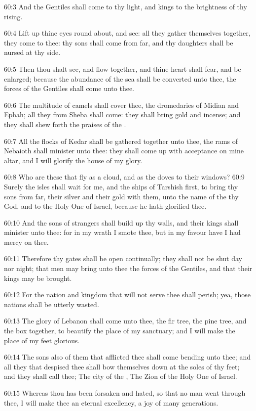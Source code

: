 60:3 And the Gentiles shall come to thy light, and kings to the
brightness of thy rising.

60:4 Lift up thine eyes round about, and see: all they gather
themselves together, they come to thee: thy sons shall come from far,
and thy daughters shall be nursed at thy side.

60:5 Then thou shalt see, and flow together, and thine heart shall
fear, and be enlarged; because the abundance of the sea shall be
converted unto thee, the forces of the Gentiles shall come unto thee.

60:6 The multitude of camels shall cover thee, the dromedaries of
Midian and Ephah; all they from Sheba shall come: they shall bring
gold and incense; and they shall shew forth the praises of the \LORD.

60:7 All the flocks of Kedar shall be gathered together unto thee, the
rams of Nebaioth shall minister unto thee: they shall come up with
acceptance on mine altar, and I will glorify the house of my glory.

60:8 Who are these that fly as a cloud, and as the doves to their
windows?  60:9 Surely the isles shall wait for me, and the ships of
Tarshish first, to bring thy sons from far, their silver and their
gold with them, unto the name of the \LORD thy God, and to the Holy One
of Israel, because he hath glorified thee.

60:10 And the sons of strangers shall build up thy walls, and their
kings shall minister unto thee: for in my wrath I smote thee, but in
my favour have I had mercy on thee.

60:11 Therefore thy gates shall be open continually; they shall not be
shut day nor night; that men may bring unto thee the forces of the
Gentiles, and that their kings may be brought.

60:12 For the nation and kingdom that will not serve thee shall
perish; yea, those nations shall be utterly wasted.

60:13 The glory of Lebanon shall come unto thee, the fir tree, the
pine tree, and the box together, to beautify the place of my
sanctuary; and I will make the place of my feet glorious.

60:14 The sons also of them that afflicted thee shall come bending
unto thee; and all they that despised thee shall bow themselves down
at the soles of thy feet; and they shall call thee; The city of the
\LORD, The Zion of the Holy One of Israel.

60:15 Whereas thou has been forsaken and hated, so that no man went
through thee, I will make thee an eternal excellency, a joy of many
generations.

